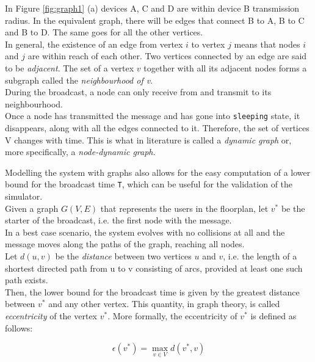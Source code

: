 In Figure \ref{fig:graph1} (a) devices A, C and D are within device B transmission radius. In the equivalent graph, there will be edges that connect B to A, B to C and B to D. The same goes for all the other vertices.\\
In general, the existence of an edge from vertex $i$ to vertex $j$ means that nodes $i$ and $j$ are within reach of each other. Two vertices connected by an edge are said to be \textit{adjacent}. The set of a vertex $v$ together with all its adjacent nodes forms a subgraph called the \textit{neighbourhood of v}.\\
During the broadcast, a node can only receive from and transmit to its neighbourhood.\\
\hfill \break
Once a node has transmitted the message and has gone into \texttt{sleeping} state, it disappears, along with all the edges connected to it. Therefore, the set of vertices V changes with time. This is what in literature is called a \textit{dynamic graph} or, more specifically, a \textit{node-dynamic graph.}

Modelling the system with graphs also allows for the easy computation of a lower bound for the broadcast time \texttt{T}, which can be useful for the validation of the simulator.\\
Given a graph $G(V, E)$ that represents the users in the floorplan, let $v^{*}$ be the starter of the broadcast, i.e. the first node with the message.\\
In a best case scenario, the system evolves with no collisions at all and the message moves along the paths of the graph, reaching all nodes.\\
Let $d(u, v)$ be the \textit{distance} between two vertices $u$ and $v$, i.e. the length of a shortest directed path from u to v consisting of arcs, provided at least one such path exists.\\
Then, the lower bound for the broadcast time is given by the greatest distance between $v^{*}$ and any other vertex. This quantity, in graph theory, is called \textit{eccentricity} of the vertex $v^{*}$. More formally, the eccentricity of $v^{*}$ is defined as follows:

\begin{equation}
\epsilon(v^{*}) = \max_{v{\in}V} d(v^{*}, v)
\end{equation}



